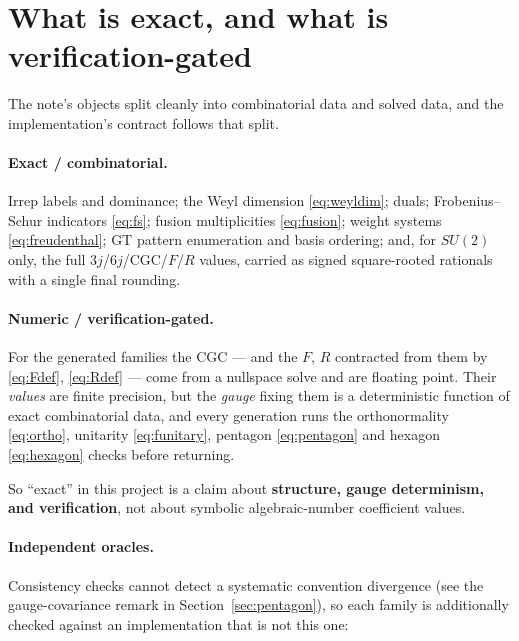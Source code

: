 \documentclass[11pt,a4paper]{article}
\theoremstyle{plain}
\theoremstyle{definition}
\begin{document}
\section{What is exact, and what is verification-gated}
\label{sec:exact}

The note's objects split cleanly into combinatorial data and solved data, and
the implementation's contract follows that split.

\paragraph{Exact / combinatorial.} Irrep labels and dominance; the Weyl
dimension \eqref{eq:weyldim}; duals; Frobenius--Schur indicators
\eqref{eq:fs}; fusion multiplicities \eqref{eq:fusion}; weight systems
\eqref{eq:freudenthal}; GT pattern enumeration and basis ordering; and, for
$SU(2)$ only, the full $3j$/$6j$/CGC/$F$/$R$ values, carried as signed
square-rooted rationals with a single final rounding.

\paragraph{Numeric / verification-gated.} For the generated families the CGC
--- and the $F$, $R$ contracted from them by \eqref{eq:Fdef},
\eqref{eq:Rdef} --- come from a nullspace solve and are floating point. Their
\emph{values} are finite precision, but the \emph{gauge} fixing them is a
deterministic function of exact combinatorial data, and every generation runs
the orthonormality \eqref{eq:ortho}, unitarity \eqref{eq:funitary}, pentagon
\eqref{eq:pentagon} and hexagon \eqref{eq:hexagon} checks before returning.

So ``exact'' in this project is a claim about \textbf{structure, gauge
determinism, and verification}, not about symbolic algebraic-number
coefficient values.

\paragraph{Independent oracles.} Consistency checks cannot detect a systematic
convention divergence (see the gauge-covariance remark in
Section~\ref{sec:pentagon}), so each family is additionally checked against an
implementation that is not this one:
\end{document}

